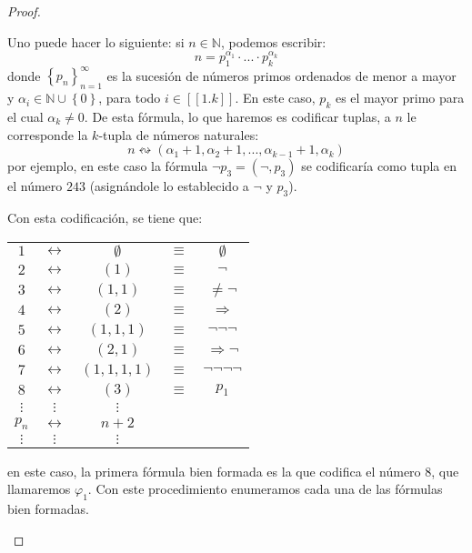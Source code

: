 \documentclass[12pt]{report}
\theoremstyle{largebreak}
\newcommand\natint[1]{\ensuremath{\left[\!\left[ #1\right]\!\right]}}
\newcounter{tablec}
\begin{document}
\begin{proof}
\begin{itemize}
            Uno puede hacer lo siguiente: si $n\in\mathbb{N}$, podemos escribir:
            \begin{equation*}
                n=p_1^{\alpha_1}\cdot...\cdot p_k^{\alpha_k}
            \end{equation*}
            donde $\left\{p_n \right\}_{ n=1}^\infty$ es la sucesión de números primos ordenados de menor a mayor y $\alpha_i\in\mathbb{N}\cup\left\{0\right\}$, para todo $i\in\natint{1.k}$. En este caso, $p_k$ es el mayor primo para el cual $\alpha_k\neq0$. De esta fórmula, lo que haremos es codificar tuplas, a $n$ le corresponde la $k$-tupla de números naturales:
            \begin{equation*}
                n\leftrightsquigarrow (\alpha_1+1,\alpha_2+1,...,\alpha_ {k-1}+1,\alpha_k)
            \end{equation*}
            por ejemplo, en este caso la fórmula $\neg p_3=(\neg,p_3)$ se codificaría como tupla en el número $243$ (asignándole lo establecido a $\neg$ y $p_3$).

            Con esta codificación, se tiene que:
            \begin{center}
                \begin{tabular}{ccccc}
                    $1$ & $\longleftrightarrow$ & $\emptyset$ & $\equiv$ & $\emptyset$ \\
                    $2$ & $\longleftrightarrow$ & $(1)$ & $\equiv$ & $\neg$ \\
                    $3$ & $\longleftrightarrow$ & $(1,1)$ & $\equiv$ & $\ne\neg$ \\
                    $4$ & $\longleftrightarrow$ & $(2)$ & $\equiv$ & $\Rightarrow$ \\
                    $5$ & $\longleftrightarrow$ & $(1,1,1)$ & $\equiv$ & $\neg\neg\neg$ \\
                    $6$ & $\longleftrightarrow$ & $(2,1)$ & $\equiv$ & $\Rightarrow\neg$ \\
                    $7$ & $\longleftrightarrow$ & $(1,1,1,1)$ & $\equiv$ & $\neg\neg\neg\neg$ \\
                    $8$ & $\longleftrightarrow$ & $(3)$ & $\equiv$ & $p_1$ \\
                    $\vdots$ & $\vdots$ & $\vdots$ \\
                    $p_n$ & $\longleftrightarrow$ & $n+2$ \\
                    $\vdots$ & $\vdots$ & $\vdots$ \\
                \end{tabular}
            \end{center}
            en este caso, la primera fórmula bien formada es la que codifica el número 8, que llamaremos $\varphi_1$. Con este procedimiento enumeramos cada una de las fórmulas bien formadas.


\end{itemize}
\end{proof}
\end{document}
